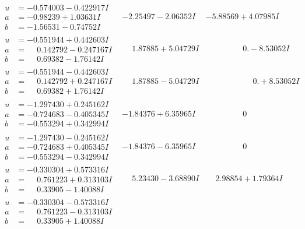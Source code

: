 \documentclass[1p]{elsarticle_modified}
\theoremstyle{definition}
\begin{document}
$$\begin{array}{c|c|c}
\begin{aligned}
u &= -0.574003 - 0.422917 I \\
a &= -0.98239 + 1.03631 I \\
b &= -1.56531 - 0.74752 I\end{aligned}
 & -2.25497 - 2.06352 I & -5.88569 + 4.07985 I \\ \hline\begin{aligned}
u &= -0.551944 + 0.442603 I \\
a &= \phantom{-}0.142792 - 0.247167 I \\
b &= \phantom{-}0.69382 - 1.76142 I\end{aligned}
 & \phantom{-}1.87885 + 5.04729 I & \phantom{-0.000000 } 0. - 8.53052 I \\ \hline\begin{aligned}
u &= -0.551944 - 0.442603 I \\
a &= \phantom{-}0.142792 + 0.247167 I \\
b &= \phantom{-}0.69382 + 1.76142 I\end{aligned}
 & \phantom{-}1.87885 - 5.04729 I & \phantom{-0.000000 -}0. + 8.53052 I \\ \hline\begin{aligned}
u &= -1.297430 + 0.245162 I \\
a &= -0.724683 - 0.405345 I \\
b &= -0.553294 + 0.342994 I\end{aligned}
 & -1.84376 + 6.35965 I & \phantom{-0.000000 } 0 \\ \hline\begin{aligned}
u &= -1.297430 - 0.245162 I \\
a &= -0.724683 + 0.405345 I \\
b &= -0.553294 - 0.342994 I\end{aligned}
 & -1.84376 - 6.35965 I & \phantom{-0.000000 } 0 \\ \hline\begin{aligned}
u &= -0.330304 + 0.573316 I \\
a &= \phantom{-}0.761223 + 0.313103 I \\
b &= \phantom{-}0.33905 - 1.40088 I\end{aligned}
 & \phantom{-}5.23430 - 3.68890 I & \phantom{-}2.98854 + 1.79364 I \\ \hline\begin{aligned}
u &= -0.330304 - 0.573316 I \\
a &= \phantom{-}0.761223 - 0.313103 I \\
b &= \phantom{-}0.33905 + 1.40088 I\end{aligned}

\end{array}$$
\end{document}
